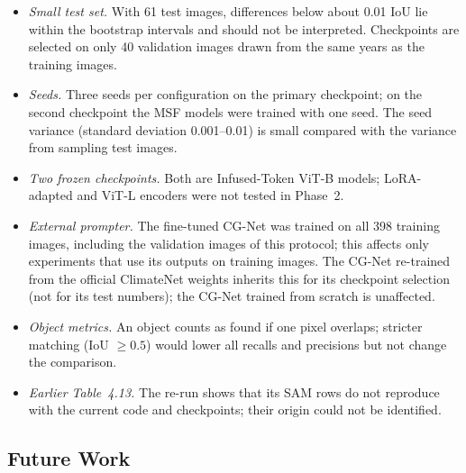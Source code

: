 \begin{itemize}
  \item \emph{Small test set.} With 61 test images, differences below about 0.01 IoU lie within the bootstrap
  intervals and should not be interpreted. Checkpoints are selected on only 40 validation images drawn from the same
  years as the training images.
  \item \emph{Seeds.} Three seeds per configuration on the primary checkpoint; on the second checkpoint the MSF models
  were trained with one seed. The seed variance (standard deviation 0.001--0.01) is small compared with the variance
  from sampling test images.
  \item \emph{Two frozen checkpoints.} Both are Infused-Token ViT-B models; LoRA-adapted and ViT-L encoders were not
  tested in Phase~2.
  \item \emph{External prompter.} The fine-tuned CG-Net was trained on all 398 training images, including the
  validation images of this protocol; this affects only experiments that use its outputs on training images. The CG-Net
  re-trained from the official ClimateNet weights inherits this for its checkpoint selection (not for its test numbers);
  the CG-Net trained from scratch is unaffected.
  \item \emph{Object metrics.} An object counts as found if one pixel overlaps; stricter matching (IoU $\ge 0.5$) would
  lower all recalls and precisions but not change the comparison.
  \item \emph{Earlier Table~4.13.} The re-run shows that its SAM rows do not reproduce with the current code and
  checkpoints; their origin could not be identified.
\end{itemize}

\subsection{Future Work}

